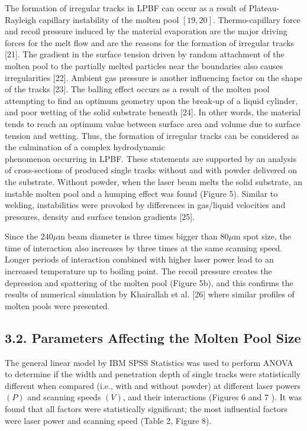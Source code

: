 \documentclass[10pt]{article}
\begin{document}
The formation of irregular tracks in LPBF can occur as a result of Plateau-Rayleigh capillary instability of the molten pool $[19,20]$. Thermo-capillary force and recoil pressure induced by the material evaporation are the major driving forces for the melt flow and are the reasons for the formation of irregular tracks [21]. The gradient in the surface tension driven by random attachment of the molten pool to the partially melted particles near the boundaries also causes irregularities [22]. Ambient gas pressure is another influencing factor on the shape of the tracks [23]. The balling effect occurs as a result of the molten pool attempting to find an optimum geometry upon the break-up of a liquid cylinder, and poor wetting of the solid substrate beneath [24]. In other words, the material tends to reach an optimum value between surface area and volume due to surface tension and wetting. Thus, the formation of irregular tracks can be considered as the culmination of a complex hydrodynamic\\
phenomenon occurring in LPBF. These statements are supported by an analysis of cross-sections of produced single tracks without and with powder delivered on the substrate. Without powder, when the laser beam melts the solid substrate, an instable molten pool and a humping effect was found (Figure 5). Similar to welding, instabilities were provoked by differences in gas/liquid velocities and pressures, density and surface tension gradients [25].

Since the $240 \mu \mathrm{m}$ beam diameter is three times bigger than $80 \mu \mathrm{m}$ spot size, the time of interaction also increases by three times at the same scanning speed. Longer periods of interaction combined with higher laser power lead to an increased temperature up to boiling point. The recoil pressure creates the depression and spattering of the molten pool (Figure 5b), and this confirms the results of numerical simulation by Khairallah et al. [26] where similar profiles of molten pools were presented.

\subsection*{3.2. Parameters Affecting the Molten Pool Size}
The general linear model by IBM SPSS Statistics was used to perform ANOVA to determine if the width and penetration depth of single tracks were statistically different when compared (i.e., with and without powder) at different laser powers $(P)$ and scanning speeds $(V)$, and their interactions (Figures 6 and 7 ). It was found that all factors were statistically significant; the most influential factors were laser power and scanning speed (Table 2, Figure 8).
\end{document}
